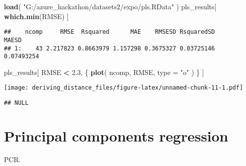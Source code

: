 \documentclass[]{article}
\newenvironment{Shaded}{\begin{snugshade}}{\end{snugshade}}
\newcommand{\DataTypeTok}[1]{\textcolor[rgb]{0.13,0.29,0.53}{#1}}
\newcommand{\DecValTok}[1]{\textcolor[rgb]{0.00,0.00,0.81}{#1}}
\newcommand{\FloatTok}[1]{\textcolor[rgb]{0.00,0.00,0.81}{#1}}
\newcommand{\KeywordTok}[1]{\textcolor[rgb]{0.13,0.29,0.53}{\textbf{#1}}}
\newcommand{\NormalTok}[1]{#1}
\newcommand{\OperatorTok}[1]{\textcolor[rgb]{0.81,0.36,0.00}{\textbf{#1}}}
\newcommand{\StringTok}[1]{\textcolor[rgb]{0.31,0.60,0.02}{#1}}
\begin{document}
\begin{Shaded}
\begin{Highlighting}[]
\KeywordTok{load}\NormalTok{( }\StringTok{"G:/azure_hackathon/datasets2/expo/pls.RData"}\NormalTok{ )}
\NormalTok{pls_results[ }\KeywordTok{which.min}\NormalTok{(RMSE) ]}
\end{Highlighting}
\end{Shaded}

\begin{verbatim}
##    ncomp     RMSE  Rsquared      MAE    RMSESD RsquaredSD      MAESD
## 1:    43 2.217823 0.8663979 1.157298 0.3675327 0.03725146 0.07493254
\end{verbatim}

\begin{Shaded}
\begin{Highlighting}[]
\NormalTok{pls_results[ RMSE }\OperatorTok{<}\StringTok{ }\FloatTok{2.3}\NormalTok{, \{}
    \KeywordTok{plot}\NormalTok{( ncomp, RMSE, }\DataTypeTok{type =} \StringTok{"o"}\NormalTok{ )}
\NormalTok{\} ]}
\end{Highlighting}
\end{Shaded}

\texttt{[image: deriving\_distance\_files/figure-latex/unnamed-chunk-11-1.pdf]}

\begin{verbatim}
## NULL
\end{verbatim}

\hypertarget{principal-components-regression}{%
\section{Principal components
regression}\label{principal-components-regression}}

PCR.

\begin{Shaded}
\end{Shaded}
\end{document}

